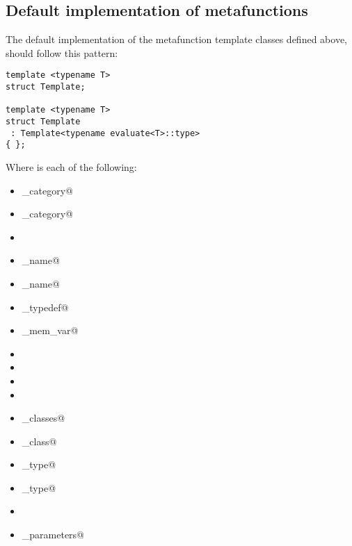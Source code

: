 \subsection{Default implementation of metafunctions}

The default implementation of the metafunction template classes defined above,
should follow this pattern:

\begin{verbatim}
template <typename T>
struct Template;

template <typename T>
struct Template
 : Template<typename evaluate<T>::type>
{ };
\end{verbatim}

Where \verb@Template@ is each of the following:

\begin{minipage}[t]{0.5\textwidth}
\begin{itemize}
\item \verb@metaobject_category@
\item \verb@specifier_category@
\item \verb@keyword@
\item \verb@base_name@
\item \verb@full_name@
\item \verb@named_typedef@
\item \verb@named_mem_var@
\item \verb@scope@
\item \verb@members@
\item \verb@overloads@
\item \verb@type@
\item \verb@base_classes@
\item \verb@base_class@
\item \verb@base_type@
\item \verb@result_type@
\item \verb@parameters@
\item \verb@template_parameters@
\end{itemize}
\end{minipage}
